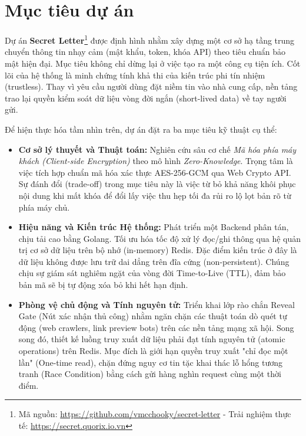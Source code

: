 \section{Mục tiêu dự án}

Dự án \textbf{Secret Letter}\footnote{Mã nguồn: \url{https://github.com/vmcchooky/secret-letter} - Trải nghiệm thực tế: \url{https://secret.quorix.io.vn}} được định hình nhằm xây dựng một cơ sở hạ tầng trung chuyển thông tin nhạy cảm (mật khẩu, token, khóa API) theo tiêu chuẩn bảo mật hiện đại. Mục tiêu không chỉ dừng lại ở việc tạo ra một công cụ tiện ích. Cốt lõi của hệ thống là minh chứng tính khả thi của kiến trúc phi tín nhiệm (trustless). Thay vì yêu cầu người dùng đặt niềm tin vào nhà cung cấp, nền tảng trao lại quyền kiểm soát dữ liệu vòng đời ngắn (short-lived data) về tay người gửi. 

Để hiện thực hóa tầm nhìn trên, dự án đặt ra ba mục tiêu kỹ thuật cụ thể:

\begin{itemize}
    \item \textbf{Cơ sở lý thuyết và Thuật toán:} Nghiên cứu sâu cơ chế \textit{Mã hóa phía máy khách (Client-side Encryption)} theo mô hình \textit{Zero-Knowledge}. Trọng tâm là việc tích hợp chuẩn mã hóa xác thực AES-256-GCM qua Web Crypto API. Sự đánh đổi (trade-off) trong mục tiêu này là việc từ bỏ khả năng khôi phục nội dung khi mất khóa để đổi lấy việc thu hẹp tối đa rủi ro lộ lọt bản rõ từ phía máy chủ.
    
    \item \textbf{Hiệu năng và Kiến trúc Hệ thống:} Phát triển một Backend phân tán, chịu tải cao bằng Golang. Tối ưu hóa tốc độ xử lý đọc/ghi thông qua hệ quản trị cơ sở dữ liệu trên bộ nhớ (in-memory) Redis. Đặc điểm kiến trúc ở đây là dữ liệu không được lưu trữ dai dẳng trên đĩa cứng (non-persistent). Chúng chịu sự giám sát nghiêm ngặt của vòng đời Time-to-Live (TTL), đảm bảo bản mã sẽ bị tự động xóa bỏ khi hết hạn định.
    
    \item \textbf{Phòng vệ chủ động và Tính nguyên tử:} Triển khai lớp rào chắn Reveal Gate (Nút xác nhận thủ công) nhằm ngăn chặn các thuật toán dò quét tự động (web crawlers, link preview bots) trên các nền tảng mạng xã hội. Song song đó, thiết kế luồng truy xuất dữ liệu phải đạt tính nguyên tử (atomic operations) trên Redis. Mục đích là giới hạn quyền truy xuất "chỉ đọc một lần" (One-time read), chặn đứng nguy cơ tin tặc khai thác lỗ hổng tương tranh (Race Condition) bằng cách gửi hàng nghìn request cùng một thời điểm.
\end{itemize}